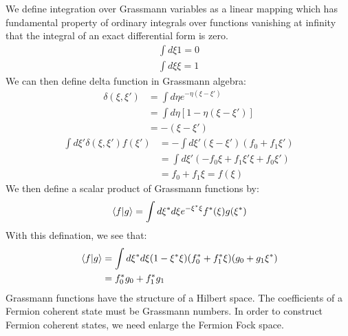 \documentclass[12pt]{article}
\begin{document}
We define integration over Grassmann variables as a linear mapping which has 
fundamental property of ordinary integrals over functions vanishing at infinity 
that the integral of an exact differential form is zero.
\begin{equation*}
    \begin{split}
        \int d\xi1=0\\
        \int d\xi\xi=1
    \end{split}
\end{equation*}
We can then define delta function in Grassmann algebra:
\begin{equation*}
    \begin{split}
        \delta(\xi,\xi')&=\int d\eta e^{-\eta(\xi-\xi')}\\
        &=\int d\eta[1-\eta(\xi-\xi')]\\
        &=-(\xi-\xi')
    \end{split}
\end{equation*}  
\begin{equation*}
    \begin{split}
        \int d\xi'\delta(\xi,\xi')f(\xi')&=-\int d\xi'(\xi-\xi')(f_0+f_1\xi')\\
        &=\int d\xi'(-f_0\xi+f_1\xi'\xi+f_0\xi')\\
        &=f_0+f_1\xi=f(\xi)
    \end{split}
\end{equation*}
We then define a scalar product of Grassmann functions by:
\begin{equation*}
    \braket*{f}{g}=\int d\xi^*d\xi e^{-\xi^*\xi}f^*(\xi)g(\xi^*)
\end{equation*}
With this defination, we see that:
\begin{equation*}
    \begin{split}
        \braket*{f}{g}&=\int d\xi^*d\xi(1-\xi^*\xi)(f_0^*+f_1^*\xi)(g_0+g_1\xi^*)\\
        &=f_0^*g_0+f_1^*g_1
    \end{split}
\end{equation*}
Grassmann functions have the structure of a Hilbert space.
The coefficients of a Fermion coherent state must be Grassmann numbers. In order 
to construct Fermion coherent states, we need enlarge the Fermion Fock space.
\end{document}
